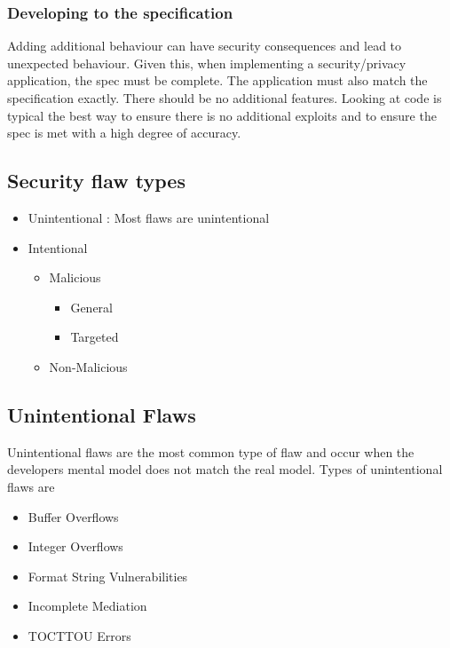 \documentclass[twoside]{article}
\begin{document}
\subsubsection{Developing to the specification }
Adding additional behaviour can have security consequences and lead to unexpected behaviour. Given this, when implementing a security/privacy application, the spec must be complete. The application must also match the specification exactly. There should be no additional features. Looking at code is typical the best way to ensure there is no additional exploits and to ensure the spec is met with a high degree of accuracy. 

\subsection{Security flaw types}
\begin{itemize}
\item Unintentional : Most flaws are unintentional
\item Intentional 
\begin{itemize}
\item Malicious
\begin{itemize}
\item General 
\item Targeted 
\end{itemize}
\item Non-Malicious 
\end{itemize} 
\end{itemize}

\subsection{Unintentional Flaws}

Unintentional flaws are the most common type of flaw and occur when the developers mental model does not match the real model. 
Types of unintentional flaws are 
\begin{itemize}
\item Buffer Overflows
\item Integer Overflows
\item Format String Vulnerabilities
\item Incomplete Mediation  
\item TOCTTOU Errors
\end{itemize}
\end{document}
